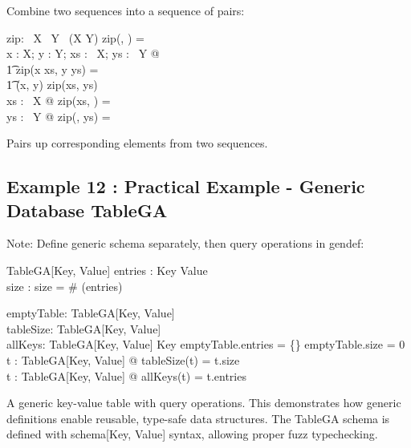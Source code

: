 \documentclass[a4paper,10pt,fleqn]{article}
\begin{document}
\noindent Combine two sequences into a sequence of pairs:

\bigskip

\begin{gendef}[X, Y]
  zip: \seq~X \cross \seq~Y \fun \seq~(X \cross Y)
\where
  zip(\langle \rangle, \langle \rangle) = \langle \rangle \\
  \forall x : X; y : Y; xs : \seq~X; ys : \seq~Y @ \\
\t1 zip(\langle x \rangle \cat xs, \langle y \rangle \cat ys) = \\
\t1 \langle (x, y) \rangle \cat zip(xs, ys) \\
  \forall xs : \seq~X @ zip(xs, \langle \rangle) = \langle \rangle \\
  \forall ys : \seq~Y @ zip(\langle \rangle, ys) = \langle \rangle
\end{gendef}

\noindent Pairs up corresponding elements from two sequences.

\bigskip

\subsection*{Example 12 : Practical Example - Generic Database TableGA}

\noindent Note: Define generic schema separately, then query operations in gendef:

\bigskip

\begin{zed}
\end{zed}

\begin{schema}{TableGA}[Key, Value]
entries : Key \pfun Value \\
size : \nat
\where
size = \# (\dom entries)
\end{schema}

\begin{gendef}
  emptyTable: TableGA[Key, Value] \\
  tableSize: TableGA[Key, Value] \fun \nat \\
  allKeys: TableGA[Key, Value] \fun \power Key
\where
  emptyTable.entries = \{\} \land emptyTable.size = 0 \\
  \forall t : TableGA[Key, Value] @ tableSize(t) = t.size \\
  \forall t : TableGA[Key, Value] @ allKeys(t) = \dom t.entries
\end{gendef}

\noindent A generic key-value table with query operations. This demonstrates how generic definitions enable reusable, type-safe data structures. The TableGA schema is defined with schema[Key, Value] syntax, allowing proper fuzz typechecking.

\bigskip
\end{document}
